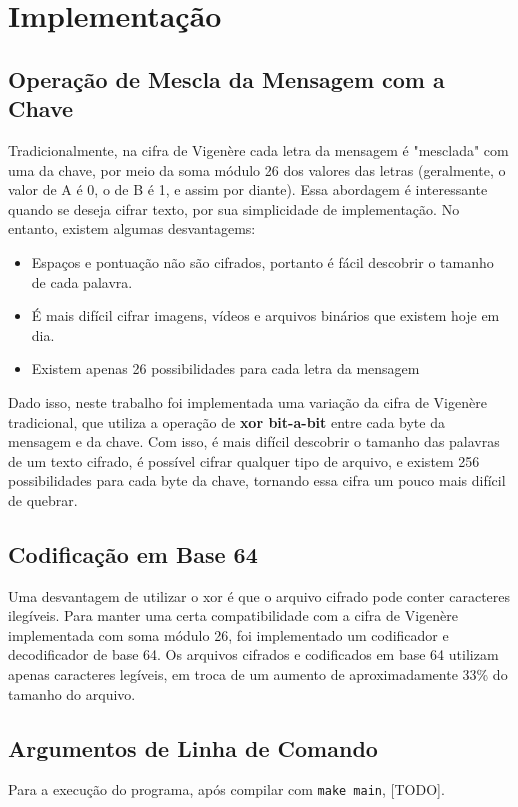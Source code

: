 \documentclass[conference]{IEEEtran}
\begin{document}
\section{Implementação}
\label{sec:implementation}

\subsection{Operação de Mescla da Mensagem com a Chave}
Tradicionalmente, na cifra de Vigenère cada letra da mensagem é "mesclada" com
uma da chave, por meio da soma módulo 26 dos valores das letras (geralmente, o
valor de A é 0, o de B é 1, e assim por diante). Essa abordagem é interessante
quando se deseja cifrar texto, por sua simplicidade de implementação. No
entanto, existem algumas desvantagems:

\begin{itemize}
    \item Espaços e pontuação não são cifrados, portanto é fácil descobrir o tamanho de cada
        palavra.
    \item É mais difícil cifrar imagens, vídeos e arquivos binários que existem
        hoje em dia.
    \item Existem apenas 26 possibilidades para cada letra da mensagem
\end{itemize}

Dado isso, neste trabalho foi implementada uma variação da cifra de Vigenère
tradicional, que utiliza a operação de \textbf{xor bit-a-bit} entre cada byte da mensagem
e da chave. Com isso, é mais difícil descobrir o tamanho das palavras de um
texto cifrado, é possível cifrar qualquer tipo de arquivo, e existem 256
possibilidades para cada byte da chave, tornando essa cifra um pouco mais
difícil de quebrar.

\subsection{Codificação em Base 64}
\label{sec:base64}
Uma desvantagem de utilizar o xor é que o arquivo cifrado pode conter caracteres
ilegíveis. Para manter uma certa compatibilidade com a cifra de Vigenère
implementada com soma módulo 26, foi implementado um codificador e decodificador
de base 64. Os arquivos cifrados e codificados em base 64 utilizam apenas
caracteres legíveis, em troca de um aumento de aproximadamente 33\% do tamanho
do arquivo.

\subsection{Argumentos de Linha de Comando}
Para a execução do programa, após compilar com \verb|make main|, [TODO].
\end{document}
